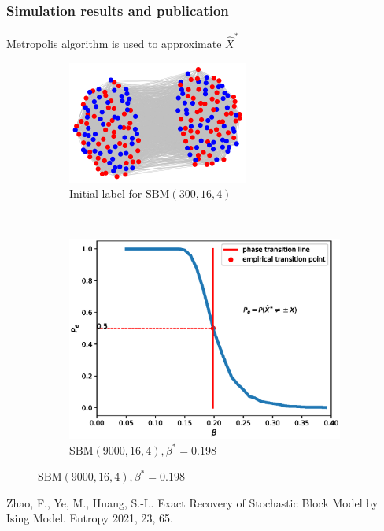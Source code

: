 \documentclass[notheorems]{beamer}
\begin{document}
	\begin{frame}
	\frametitle{Simulation results and publication}
	Metropolis algorithm is used to approximate $\hat{X}^*$
	
	\begin{figure}
		\centering
		\begin{subfigure}{0.45\textwidth}
			\includegraphics[width=\textwidth]{000.png}
			\caption{Initial label for $\textrm{SBM}(300, 16, 4)$}
		\end{subfigure}~
		\begin{subfigure}{0.53\textwidth}
			\includegraphics[width=\textwidth]{beta_trans-2020-11-28.eps}
			\caption{$\textrm{SBM}(9000, 16, 4), \beta^*=0.198$}
		\end{subfigure}
	\end{figure}
	Zhao, F., Ye, M., Huang, S.-L. Exact Recovery of Stochastic Block Model by Ising Model. Entropy 2021, 23, 65.
	
\end{frame}
	
\end{document}
